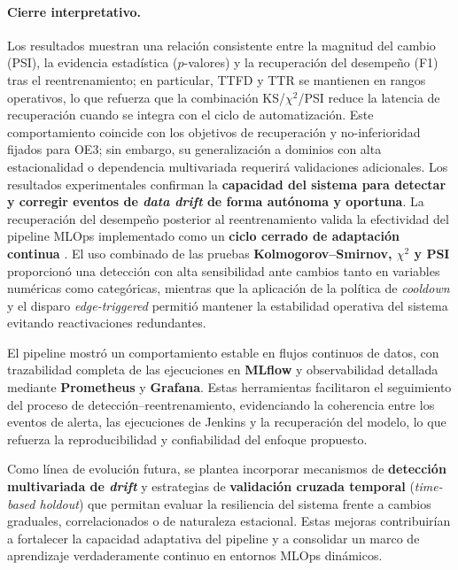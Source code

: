 \paragraph{Cierre interpretativo.} Los resultados muestran una relación consistente entre la magnitud del cambio (PSI), la evidencia estadística ($p$-valores) y la recuperación del desempeño (F1) tras el reentrenamiento; en particular, TTFD y TTR se mantienen en rangos operativos, lo que refuerza que la combinación KS/$\chi^2$/PSI reduce la latencia de recuperación cuando se integra con el ciclo de automatización.
Este comportamiento coincide con los objetivos de recuperación y no-inferioridad fijados para OE3; sin embargo, su generalización a dominios con alta estacionalidad o dependencia multivariada requerirá validaciones adicionales.
Los resultados experimentales confirman la \textbf{capacidad del sistema para detectar y corregir eventos de \textit{data drift} de forma autónoma y oportuna}.  
La recuperación del desempeño posterior al reentrenamiento valida la efectividad del pipeline MLOps implementado como un \textbf{ciclo cerrado de adaptación continua} \citep{Chatterjee2023,RodriguezSimmhan2023}.  
El uso combinado de las pruebas \textbf{Kolmogorov–Smirnov, $\chi^2$ y PSI} proporcionó una detección con alta sensibilidad ante cambios tanto en variables numéricas como categóricas, mientras que la aplicación de la política de \textit{cooldown} y el disparo \textit{edge-triggered} permitió mantener la estabilidad operativa del sistema evitando reactivaciones redundantes.

El pipeline mostró un comportamiento estable en flujos continuos de datos, con trazabilidad completa de las ejecuciones en \textbf{MLflow} y observabilidad detallada mediante \textbf{Prometheus} y \textbf{Grafana}.  
Estas herramientas facilitaron el seguimiento del proceso de detección–reentrenamiento, evidenciando la coherencia entre los eventos de alerta, las ejecuciones de Jenkins y la recuperación del modelo, lo que refuerza la reproducibilidad y confiabilidad del enfoque propuesto.

Como línea de evolución futura, se plantea incorporar mecanismos de \textbf{detección multivariada de \textit{drift}} y estrategias de \textbf{validación cruzada temporal} (\textit{time-based holdout}) que permitan evaluar la resiliencia del sistema frente a cambios graduales, correlacionados o de naturaleza estacional.  
Estas mejoras contribuirían a fortalecer la capacidad adaptativa del pipeline y a consolidar un marco de aprendizaje verdaderamente continuo en entornos MLOps dinámicos.


